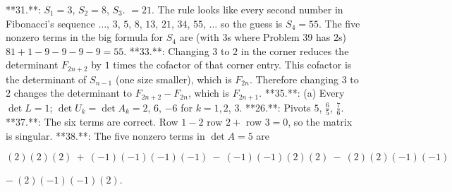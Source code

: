 **31.**: \(S_{1}=3\), \(S_{2}=8\), \(S_{3}\). \(=21\). The rule looks like every second number in Fibonacci's sequence \(\ldots\), \(3\), \(5\), \(8\), \(13\), \(21\), \(34\), \(55\), \(\ldots\) so the guess is \(S_{4}=55\). The five nonzero terms in the big formula for \(S_{4}\) are (with \(3\)s where Problem 39 has \(2\)s) \(81+1-9-9-9-9=55\).
**33.**: Changing \(3\) to \(2\) in the corner reduces the determinant \(F_{2n+2}\) by \(1\) times the cofactor of that corner entry. This cofactor is the determinant of \(S_{n-1}\) (one size smaller), which is \(F_{2n}\). Therefore changing \(3\) to \(2\) changes the determinant to \(F_{2n+2}-F_{2n}\), which is \(F_{2n+1}\).
**35.**: (a) Every \(\det L=1\); \(\det U_{k}=\det A_{k}=2\), \(6\), \(-6\) for \(k=1,2\), \(3\).
**26.**: Pivots \(5\), \(\frac{6}{5}\), \(\frac{7}{6}\).
**37.**: The six terms are correct. Row \(1-2\) row \(2+\) row \(3=0\), so the matrix is singular.
**38.**: The five nonzero terms in \(\det A=5\) are

\((2)(2)(2)\ +\ (-1)(-1)(-1)(-1)\ -\ (-1)(-1)(2)(2)\ -\ (2)(2)(-1)(-1)\)

\(-\ (2)(-1)(-1)(2)\).


